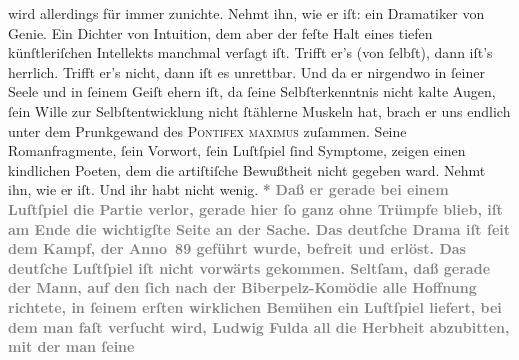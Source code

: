 \begin{ledgroupsized}[t]{13cm}
{{                  wird allerdings für immer zunichte. Nehmt ihn, wie er iſt: ein Dramatiker von
                  Genie. Ein Dichter von Intuition, dem aber der feſte Halt eines tiefen
                  künſtleriſchen Intellekts manchmal verſagt iſt. Trifft er’s (von ſelbſt), dann
                  iſt’s herrlich. Trifft er’s nicht, dann iſt es unrettbar. Und da er nirgendwo in
                  ſeiner Seele und in ſeinem Geiſt ehern iſt, da ſeine Selbſterkenntnis nicht kalte
                  Augen, ſein Wille zur Selbſtentwicklung nicht ſtählerne Muskeln hat, brach er uns
                  endlich unter dem Prunkgewand des \textsc{Pontifex maximus}
                  zuſammen. Seine Romanfragmente, ſein Vorwort, ſein Luſtſpiel ſind Symptome, zeigen einen kindlichen Poeten, dem die
                  artiſtiſche Bewußtheit nicht gegeben ward. Nehmt ihn, wie er iſt. Und ihr habt
                  nicht wenig.}}\pend
           \pstart
           \centering{}\textcolor{gray}{\textbf{*}}\pend
           \pstart
           \noindent{}\textcolor{gray}{\textbf{Daß er gerade bei einem Luſtſpiel die Partie verlor, gerade hier
                  ſo ganz ohne Trümpfe blieb, iſt am Ende die wichtigſte Seite an der Sache. Das
                  deutſche Drama iſt ſeit dem Kampf, der Anno 89 geführt
                  wurde, befreit und erlöst. Das deutſche Luſtſpiel iſt nicht vorwärts gekommen.
                  Seltſam, daß gerade der Mann, auf den ſich nach der Biberpelz-Komödie alle Hoffnung richtete, in ſeinem erſten
                  wirklichen Bemühen ein Luſtſpiel liefert, bei dem man faſt verſucht wird, Ludwig Fulda all die Herbheit abzubitten, mit der man ſeine
}}
\end{ledgroupsized}
